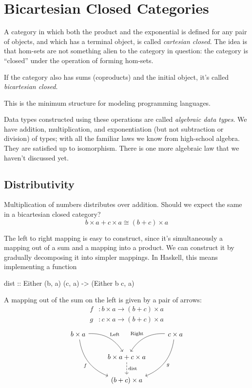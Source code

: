 \documentclass[DaoFP]{subfiles}
\begin{document}
\section{Bicartesian Closed Categories}

A category in which both the product and the exponential is defined for any pair of objects, and which has a terminal object, is called \emph{cartesian closed}. The idea is that hom-sets are not something alien to the category in question: the category is ``closed'' under the operation of forming hom-sets.

If the category also has sums (coproducts) and the initial object, it's called \emph{bicartesian closed}. 

This is the minimum structure for modeling programming languages. 

Data types constructed using these operations are called \emph{algebraic data types}. We have addition, multiplication, and exponentiation (but not subtraction or division) of types; with all the familiar laws we know from high-school algebra. They are satisfied up to isomorphism. There is one more algebraic law that we haven't discussed yet.

\subsection{Distributivity}

Multiplication of numbers distributes over addition. Should we expect the same in a bicartesian closed category?
\[b \times a + c \times a \cong (b + c) \times a\]

The left to right mapping is easy to construct, since it's simultaneously a mapping out of a sum and a mapping into a product. We can construct it by gradually decomposing it into simpler mappings. In Haskell, this means implementing a function
\begin{haskell}
dist :: Either (b, a) (c, a) -> (Either b c, a)
\end{haskell}
A mapping out of the sum on the left is given by a pair of arrows:
\begin{align*}
f &\colon b\times a \to (b + c) \times a \\
g &\colon c\times a \to (b + c) \times a 
\end{align*}
\[
 \begin{tikzcd}
 b \times a
 \arrow[dr,  bend left, "\text{Left}"]
 \arrow[ddr, bend right, "f"']
 && c \times a
 \arrow[dl, bend right, "\text{Right}"']
 \arrow[ddl, bend left, "g"]
 \\
& b \times a + c \times a
\arrow[d, dashed, "\text{dist}"]
\\
& (b + c) \times a
 \end{tikzcd}
\]
\end{document}
